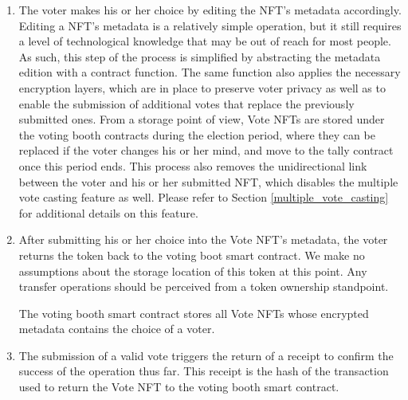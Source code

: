 \documentclass[../main.tex]{subfiles}
\begin{document}
\begin{enumerate}
    \item{The voter makes his or her choice by editing the NFT's metadata accordingly. Editing a NFT's metadata is a relatively simple operation, but it still requires a level of technological knowledge that may be out of reach for most people. As such, this step of the process is simplified by abstracting the metadata edition with a contract function. The same function also applies the necessary encryption layers, which are in place to preserve voter privacy as well as to enable the submission of additional votes that replace the previously submitted ones. From a storage point of view, Vote NFTs are stored under the voting booth contracts during the election period, where they can be replaced if the voter changes his or her mind, and move to the tally contract once this period ends. This process also removes the unidirectional link between the voter and his or her submitted NFT, which disables the multiple vote casting feature as well. Please refer to Section \ref{multiple_vote_casting} for additional details on this feature.}

    \item{After submitting his or her choice into the Vote NFT's metadata, the voter returns the token back to the voting boot smart contract. We make no assumptions about the storage location of this token at this point. Any transfer operations should be perceived from a token ownership standpoint.
          \par
          The voting booth smart contract stores all Vote NFTs whose encrypted metadata contains the choice of a voter.}

    \item{The submission of a valid vote triggers the return of a receipt to confirm the success of the operation thus far. This receipt is the hash of the transaction used to return the Vote NFT to the voting booth smart contract.}


\end{enumerate}
\end{document}
